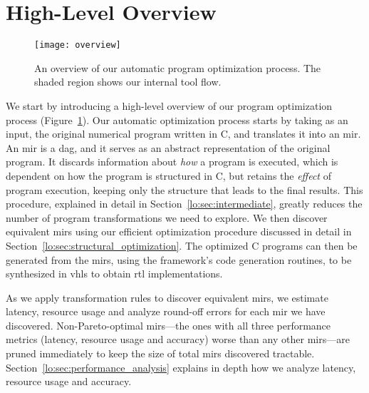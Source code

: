 \section{High-Level Overview}
\label{lo:sec:overview}

\begin{figure}[ht]
    \centering
    \texttt{[image: overview]}
    \caption{%
        An overview of our automatic program optimization process. The shaded
        region shows our internal tool flow.
    }\label{lo:fig:overview}
\end{figure}

We start by introducing a high-level overview of our program optimization
process (Figure~\ref{lo:fig:overview}).  Our automatic optimization process
starts by taking as an input, the original numerical program written in C, and
translates it into an \gls{mir}\@.  An \gls{mir} is a \gls{dag}, and it serves
as an abstract representation of the original program.  It discards information
about \emph{how} a program is executed, which is dependent on how the program
is structured in C, but retains the \emph{effect} of program execution, keeping
only the structure that leads to the final results.  This procedure, explained
in detail in Section~\ref{lo:sec:intermediate}, greatly reduces the number
of program transformations we need to explore.  We then discover equivalent
\glspl{mir} using our efficient optimization procedure discussed in detail
in Section~\ref{lo:sec:structural_optimization}.  The optimized C programs
can then be generated from the \glspl{mir}, using the \soap{} framework's
code generation routines, to be synthesized in \gls{vhls} to obtain \gls{rtl}
implementations.

As we apply transformation rules to discover equivalent \glspl{mir}, we
estimate latency, resource usage and analyze round-off errors for each
\gls{mir} we have discovered.  Non-Pareto-optimal \glspl{mir}---the ones with
all three performance metrics (latency, resource usage and accuracy) worse
than any other \glspl{mir}---are pruned immediately to keep the size of total
\glspl{mir} discovered tractable.  Section~\ref{lo:sec:performance_analysis}
explains in depth how we analyze latency, resource usage and accuracy.
